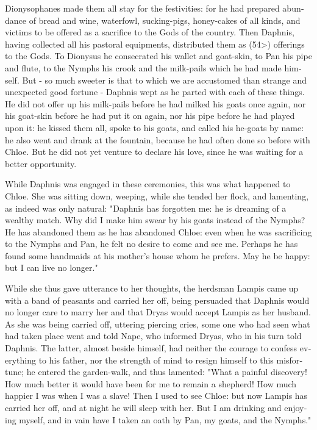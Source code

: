 \documentclass{book}
\begin{document}
\begin{pairs}
\begin{Rightside}
\begin{english}
  Dionysophanes made them all stay for the festivities: for he had prepared abundance of bread and wine, waterfowl, sucking-pigs, honey-cakes of all kinds, and victims to be offered as a sacrifice to the Gods of the country.  Then Daphnis, having collected all his pastoral equipments, distributed them as (54>) offerings to the Gods.  To Dionysus he consecrated his wallet and goat-skin, to Pan his pipe and flute, to the Nymphs his crook and the milk-pails which he had made himself.  But - so much sweeter is that to which we are accustomed than strange and unexpected good fortune - Daphnis wept as he parted with each of these things.  He did not offer up his milk-pails before he had milked his goats once again, nor his goat-skin before he had put it on again, nor his pipe before he had played upon it: he kissed them all, spoke to his goats, and called his he-goats by name: he also went and drank at the fountain, because he had often done so before with Chloe.  But he did not yet venture to declare his love, since he was waiting for a better opportunity.
\pend


  While Daphnis was engaged in these ceremonies, this was what happened to Chloe.  She was sitting down, weeping, while she tended her flock, and lamenting, as indeed was only natural: "Daphnis has forgotten me: he is dreaming of a wealthy match.  Why did I make him swear by his goats instead of the Nymphs?  He has abandoned them as he has abandoned Chloe: even when he was sacrificing to the Nymphs and Pan, he felt no desire to come and see me.  Perhaps he has found some handmaids at his mother's house whom he prefers.  May he be happy: but I can live no longer."
\pend


  While she thus gave utterance to her thoughts, the herdsman Lampis came up with a band of peasants and carried her off, being persuaded that Daphnis would no longer care to marry her and that Dryas would accept Lampis as her husband.  As she was being carried off, uttering piercing cries, some one who had seen what had taken place went and told Nape, who informed Dryas, who in his turn told Daphnis.  The latter, almost beside himself, had neither the courage to confess everything to his father, nor the strength of mind to resign himself to this misfortune; he entered the garden-walk, and thus lamented:  "What a painful discovery!  How much better it would have been for me to remain a shepherd!  How much happier I was when I was a slave!  Then I used to see Chloe: but now Lampis has carried her off, and at night he will sleep with her.  But I am drinking and enjoying myself, and in vain have I taken an oath by Pan, my goats, and the Nymphs."
\pend



\end{english}
\end{Rightside}
\end{pairs}
\end{document}
